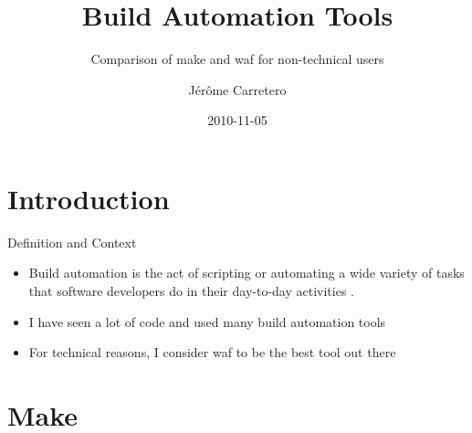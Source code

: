 \documentclass[xetex]{beamer}
\title[Build Tools]{
	Build Automation Tools
}
\subtitle{
	Comparison of make and waf for non-technical users
}
\author[]{Jérôme Carretero}
\institute[] {}
\date{2010-11-05}
\begin{document}
\lstset{
 language=make,
 basicstyle=\tiny,%
 showspaces=false,%
 showstringspaces=false,%
 showtabs=false,%
 frame=single,%
 tabsize=4,%
 captionpos=b,%
 breaklines=true,%
 breakatwhitespace=false,%
}






\section{Introduction}

\begin{frame}{Definition and Context}
	\begin{itemize}
		\item Build automation is the act of scripting or automating a wide variety of tasks that software developers do in their day-to-day activities \cite{wp_build_automation}.
		\item I have seen a lot of code and used many build automation tools
		\item For technical reasons, I consider waf to be the best tool out there
	\end{itemize}
\end{frame}

\section{Make}
\end{document}
